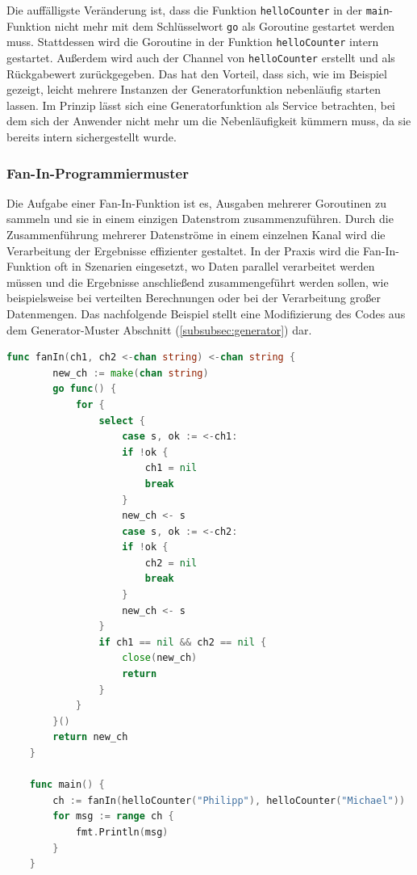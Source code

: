 \documentclass[fontsize=12pt,paper=a4,twoside=semi,parskip=half-,headsepline,headinclude]{scrreprt}
\begin{document}
Die auffälligste Veränderung ist, dass die Funktion \texttt{helloCounter} in der \texttt{main}-Funktion nicht mehr mit dem Schlüsselwort \texttt{go} als Goroutine gestartet werden muss. Stattdessen wird die Goroutine in der Funktion \texttt{helloCounter} intern gestartet. Außerdem wird auch der Channel von \texttt{helloCounter} erstellt und als Rückgabewert zurückgegeben. Das hat den Vorteil, dass sich, wie im Beispiel gezeigt, leicht mehrere Instanzen der Generatorfunktion nebenläufig starten lassen. Im Prinzip lässt sich eine Generatorfunktion als Service betrachten, bei dem sich der Anwender nicht mehr um die Nebenläufigkeit kümmern muss, da sie bereits intern sichergestellt wurde.

\subsubsection{Fan-In-Programmiermuster}

Die Aufgabe einer Fan-In-Funktion ist es, Ausgaben mehrerer Goroutinen zu sammeln und sie in einem einzigen Datenstrom zusammenzuführen. Durch die Zusammenführung mehrerer Datenströme in einem einzelnen Kanal wird die Verarbeitung der Ergebnisse effizienter gestaltet. In der Praxis wird die Fan-In-Funktion oft in Szenarien eingesetzt, wo Daten parallel verarbeitet werden müssen und die Ergebnisse anschließend zusammengeführt werden sollen, wie beispielsweise bei verteilten Berechnungen oder bei der Verarbeitung großer Datenmengen. Das nachfolgende Beispiel stellt eine Modifizierung des Codes aus dem Generator-Muster Abschnitt (\ref{subsubsec:generator}) dar.

\begin{lstlisting}[language=Go,extendedchars=true]
	func fanIn(ch1, ch2 <-chan string) <-chan string {
		new_ch := make(chan string)
		go func() {
			for {
				select {
					case s, ok := <-ch1:
					if !ok {
						ch1 = nil
						break
					}
					new_ch <- s
					case s, ok := <-ch2:
					if !ok {
						ch2 = nil
						break
					}
					new_ch <- s
				}
				if ch1 == nil && ch2 == nil {
					close(new_ch)
					return
				}
			}
		}()
		return new_ch
	}

	func main() {
		ch := fanIn(helloCounter("Philipp"), helloCounter("Michael"))
		for msg := range ch {
			fmt.Println(msg)
		}
	}
\end{lstlisting}
\end{document}
